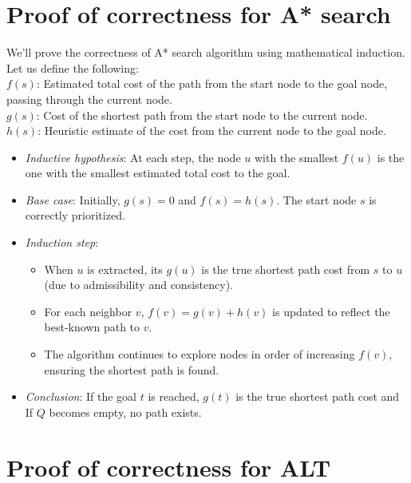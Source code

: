 \begin{appendices}
	\section{Proof of correctness for A* search}\label{appendix:astar:correctness}
	We'll prove the correctness of A* search algorithm using mathematical induction. Let us define the following: \\
	$f(s)$: Estimated total cost of the path from the start node to the goal node, passing through the current node. \\
	$g(s)$: Cost of the shortest path from the start node to the current node. \\
	$h(s)$: Heuristic estimate of the cost from the current node to the goal node.
	\begin{itemize}
		\item \textit{Inductive hypothesis}: At each step, the node $u$ with the smallest $f(u)$ is the one with the smallest estimated total cost to the goal.
		\item \textit{Base case}: Initially, $g(s)=0$ and $f(s)=h(s)$. The start node $s$ is correctly prioritized.
		\item \textit{Induction step}: 
			\begin{itemize}
				\item When $u$ is extracted, its $g(u)$ is the true shortest path cost from $s$ to $u$ (due to admissibility and consistency).
				\item For each neighbor $v$, $f(v)=g(v)+h(v)$ is updated to reflect the best-known path to $v$.
				\item The algorithm continues to explore nodes in order of increasing $f(v)$, ensuring the shortest path is found.
			\end{itemize}
		\item \textit{Conclusion}: If the goal $t$ is reached, $g(t)$ is the true shortest path cost and If $Q$ becomes empty, no path exists.
	\end{itemize}

\section{Proof of correctness for ALT}\label{appendix:ALT:correctness}


\end{appendices}
